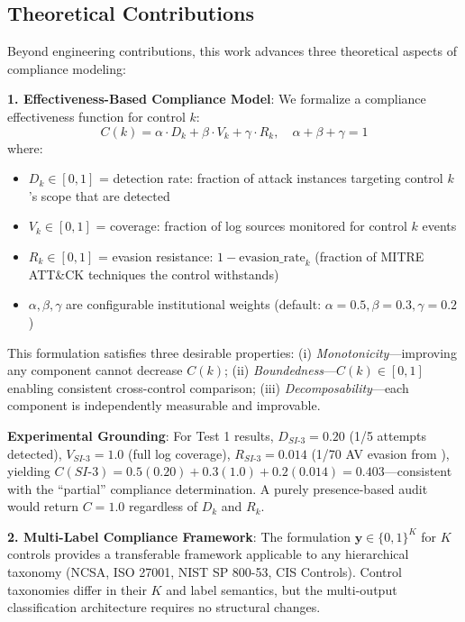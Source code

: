 \documentclass[11pt,conference]{IEEEtran}
\begin{document}
\subsection{Theoretical Contributions}
\label{sec:theory}

Beyond engineering contributions, this work advances three theoretical aspects of compliance modeling:

\textbf{1. Effectiveness-Based Compliance Model}: We formalize a compliance effectiveness function for control $k$:
\begin{equation}
C(k) = \alpha \cdot D_k + \beta \cdot V_k + \gamma \cdot R_k, \quad \alpha + \beta + \gamma = 1
\label{eq:compliance}
\end{equation}
where:
\begin{itemize}
    \item $D_k \in [0,1]$ = detection rate: fraction of attack instances targeting control $k$'s scope that are detected
    \item $V_k \in [0,1]$ = coverage: fraction of log sources monitored for control $k$ events
    \item $R_k \in [0,1]$ = evasion resistance: $1 - \text{evasion\_rate}_k$ (fraction of MITRE ATT\&CK techniques the control withstands)
    \item $\alpha, \beta, \gamma$ are configurable institutional weights (default: $\alpha = 0.5, \beta = 0.3, \gamma = 0.2$)
\end{itemize}

This formulation satisfies three desirable properties: (i) \textit{Monotonicity}---improving any component cannot decrease $C(k)$; (ii) \textit{Boundedness}---$C(k) \in [0,1]$ enabling consistent cross-control comparison; (iii) \textit{Decomposability}---each component is independently measurable and improvable.

\textbf{Experimental Grounding}: For Test 1 results, $D_{SI\text{-}3} = 0.20$ (1/5 attempts detected), $V_{SI\text{-}3} = 1.0$ (full log coverage), $R_{SI\text{-}3} = 0.014$ (1/70 AV evasion from \cite{reverse_shell_paper}), yielding $C(SI\text{-}3) = 0.5(0.20) + 0.3(1.0) + 0.2(0.014) = 0.403$---consistent with the ``partial'' compliance determination. A purely presence-based audit would return $C = 1.0$ regardless of $D_k$ and $R_k$.

\textbf{2. Multi-Label Compliance Framework}: The formulation $\mathbf{y} \in \{0,1\}^K$ for $K$ controls provides a transferable framework applicable to any hierarchical taxonomy (NCSA, ISO 27001, NIST SP 800-53, CIS Controls). Control taxonomies differ in their $K$ and label semantics, but the multi-output classification architecture requires no structural changes.
\end{document}
